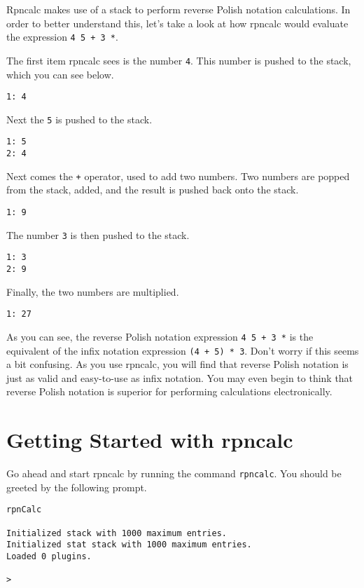 \documentclass[12pt,letterpaper]{book}
\begin{document}
Rpncalc makes use of a stack to perform reverse Polish notation calculations. In order to better understand this, let's take a look at how rpncalc would evaluate the expression \verb|4 5 + 3 *|.

The first item rpncalc sees is the number \verb|4|. This number is pushed to the stack, which you can see below.

\begin{lstlisting}
1: 4
\end{lstlisting}

Next the \verb|5| is pushed to the stack.

\begin{lstlisting}
1: 5
2: 4
\end{lstlisting}

Next comes the \verb|+| operator, used to add two numbers. Two numbers are popped from the stack, added, and the result is pushed back onto the stack.

\begin{lstlisting}
1: 9
\end{lstlisting}

The number \verb|3| is then pushed to the stack.

\begin{lstlisting}
1: 3
2: 9
\end{lstlisting}

Finally, the two numbers are multiplied.

\begin{lstlisting}
1: 27
\end{lstlisting}

As you can see, the reverse Polish notation expression \verb|4 5 + 3 *| is the equivalent of the infix notation expression \verb|(4 + 5) * 3|. Don't worry if this seems a bit confusing. As you use rpncalc, you will find that reverse Polish notation is just as valid and easy-to-use as infix notation. You may even begin to think that reverse Polish notation is superior for performing calculations electronically.

\section{Getting Started with rpncalc}

Go ahead and start rpncalc by running the command \verb|rpncalc|. You should be greeted by the following prompt.

\begin{lstlisting}
rpnCalc

Initialized stack with 1000 maximum entries.
Initialized stat stack with 1000 maximum entries.
Loaded 0 plugins.

> 
\end{lstlisting}
\end{document}
